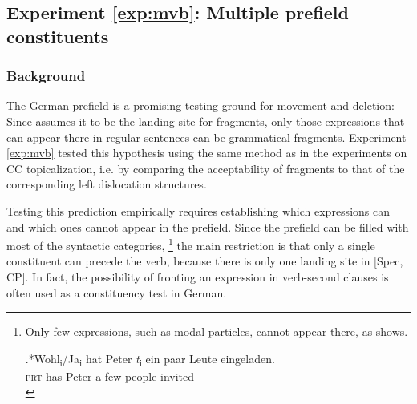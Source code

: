 \label{exp:mvb}
\subsection{Experiment \ref{exp:mvb}: Multiple prefield constituents}
\subsubsection{Background}\label{sec:mvb-background}
The German prefield is a promising testing ground for movement and deletion: Since \citet{merchant2004} assumes it to be the landing site for fragments, only those expressions that can appear there in regular sentences can be grammatical fragments. Experiment \ref{exp:mvb} tested this hypothesis using the same method as in the experiments on CC topicalization, i.e. by comparing the acceptability of fragments to that of the corresponding left dislocation structures.

Testing this prediction empirically requires establishing which expressions can and which ones cannot appear in the prefield. Since the prefield can be filled with most of the syntactic categories,%
%
\footnote{Only few expressions, such as modal particles, cannot appear there, as \Next shows.

\exg.*Wohl\textsubscript{i}/Ja\textsubscript{i} hat Peter \textit{t}\textsubscript{i} ein paar Leute eingeladen.\\
\textsc{prt} has Peter \mbox{} a few people invited\\

}\afterfn%
%
the main restriction is that only a single constituent can precede the verb, because there is only one landing site in [Spec, CP]. In fact, the possibility of fronting an expression in verb-second clauses is often used as a constituency test in German. 

